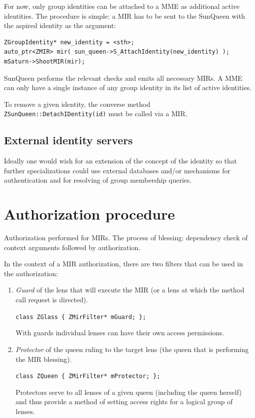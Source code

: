 \documentclass[a4paper,11pt]{article}
\def\smalltt#1{{\small\texttt{#1}}}
\begin{document}
For now, only group identities can be attached to a MME as additional
active identities. The procedure is simple: a MIR has to be sent to
the SunQueen with the aspired identity as the argument:
{\footnotesize\begin{verbatim}
ZGroupIdentity* new_identity = <sth>;
auto_ptr<ZMIR> mir( sun_queen->S_AttachIdentity(new_identity) );
mSaturn->ShootMIR(mir);
\end{verbatim}}
SunQueen performs the relevant checks and emits all necessary
MIRs. A MME can only have a single instance of any group identity
in its list of active identities.

To remove a given identity, the converse method
\smalltt{ZSunQueen::DetachIDentity(id)} must be called via a MIR.

\subsection{External identity servers}

Ideally one would wish for an extension of the concept of the identity
so that further specializations could use external databases and/or
mechanisms for authentication and for resolving of group membership
queries.


\section{Authorization procedure}
\label{sec:Authorization}

Authorization performed for MIRs. The process of blessing: dependency
check of context arguments followed by authorization.

In the context of a MIR authorization, there are two filters that
can be used in the authorization:
\begin{enumerate}

\item \emph{Guard} of the lens that will execute the MIR (or a lens
  at which the method call request is directed).

 \smalltt{class ZGlass\,\{\,ZMirFilter* mGuard;\,\};}

 With guards individual lenses can have their own access permissions.
 
\item \emph{Protector} of the queen ruling to the target lens (the
  queen that is performing the MIR blessing).

  \smalltt{class ZQueen\,\{\,ZMirFilter* mProtector;\,\};}

  Protectors serve to all lenses of a given queen (including the queen
  herself) and thus provide a method of setting access rights for a
  logical group of lenses.

\end{enumerate}
\end{document}
